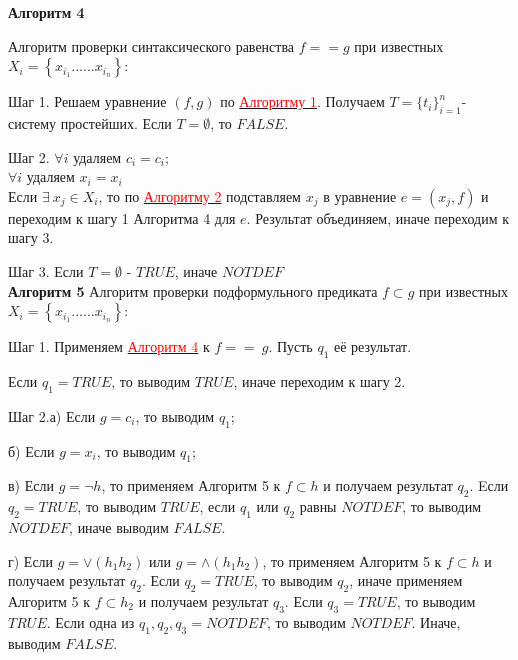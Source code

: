 \documentclass[12pt]{article}
\begin{document}
     \hypertarget{a4}{{\bf Алгоритм 4}} Алгоритм проверки синтаксического равенства $f == g $ при известных $ X_{i} = \left\lbrace x_{i_{1}} ......x_{i_{n}}\right\rbrace $: 
     
\begin{comment}     
     Шаг 0. Если $Len(f) \neq Len(g)$, то $FALSE$, иначе переходим к шагу 1.
\end{comment}     
     Шаг 1. Решаем уравнение $(f,g)$ по \hyperlink{a1}{ \textcolor{red} {Алгоритму 1}}.  Получаем  $T = \lbrace  t_{i}  \rbrace_{i=1}^{n} $- систему простейших. Если  $ T= {\emptyset}$, то $FALSE$.
     
     Шаг 2. $\forall i$ удаляем $c_{i} = c_{i}$; 
     \\
      $\forall i$ удаляем $x_{i} = x_{i}$
     \\ 
     Если $\exists \: x_{j} \in X_{i}$, то по \hyperlink{a2}{ \textcolor{red}{Алгоритму 2}} подставляем $x_{j}$  в уравнение $e = (x_{j}, f)$ и переходим к шагу 1 Алгоритма 4 для $e$. Результат объединяем, иначе переходим к шагу 3.
     
     Шаг 3. Если $ T= {\emptyset}$ - $TRUE$, иначе $NOTDEF$
     \\
     
      \hypertarget{a5}{{\bf Алгоритм 5}} Алгоритм проверки подформульного предиката $f \subset g $ при известных $ X_{i} = \left\lbrace x_{i_{1}} ......x_{i_{n}}\right\rbrace $:
\begin{comment}
     Шаг 0. Если $Len(f) > Len(g)$, то $FALSE$, иначе переходим к шагу 1.
\end{comment} 
    
     Шаг 1. Применяем \hyperlink{a3}{ \textcolor{red}{Алгоритм 4}}  к $f == \:g$. Пусть $q_{1}$ её результат.
\begin{comment}
      Если $q_{1} = NOTDEF$, то выводим $q_{1}$
\end{comment}
     
      Если $q_{1} = TRUE$, то выводим $TRUE$, иначе переходим к шагу 2.
     
     Шаг 2.а) Если $ g = c_{i}$, то выводим $q_{1}$;
     
      б) Если $ g = x_{i}$, то выводим $q_{1}$;
      
    в) Если $ g = \neg h$, то применяем  Алгоритм 5 к  $f\subset h$ и получаем результат $q_{2}$. Eсли $q_{2} = TRUE$, то выводим $TRUE$, если $q_{1}$ или $q_{2}$ равны $NOTDEF$, то выводим $NOTDEF$, иначе выводим $FALSE$.
    
    г) Если $ g = \vee (h_{1} h_{2})$ или  $ g = \wedge (h_{1} h_{2})$, то применяем  Алгоритм 5 к  $f\subset h$   и получаем результат $q_{2}$. Если $q_{2} = TRUE$, то выводим $q_{2}$, иначе применяем Алгоритм 5 к $f\subset h_{2}$ и  получаем результат  $q_{3}$. Если $q_{3} = TRUE$, то выводим $TRUE$. Если одна из $q_{1}, q_{2}, q_{3} = NOTDEF$, то выводим $NOTDEF$. Иначе, выводим $FALSE$.
     \\
     
\end{document}
